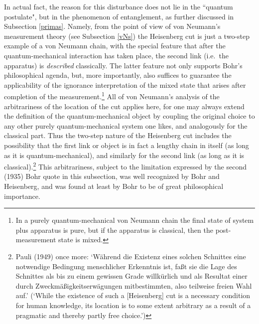 \documentclass[12pt,titlepage]{article}
\begin{document}
In actual fact, the reason for this disturbance does not lie in the    ``quantum postulate",  but in the phenomenon of entanglement, as further discussed in Subsection  \ref{primas}.
Namely, from the point of view of von Neumann's measurement theory (see Subsection \ref{vNs})
 the Heisenberg cut is just a two-step example of a von Neumann chain, with the special feature that after the quantum-mechanical interaction has taken place, the second link (i.e.\ the apparatus) is {\it described} classically.
The latter feature not only supports  Bohr's philosophical agenda, but, more importantly,
also suffices to guarantee the applicability of the ignorance interpretation of the mixed state that arises after completion of the measurement.\footnote{In a purely quantum-mechanical von Neumann chain the final state of system plus apparatus is pure, but if the
apparatus  is classical, then  the post-measurement state is mixed.} 
 All of von Neumann's analysis of the arbitrariness of the location of the cut applies here, for  one may always extend the definition of the quantum-mechanical object by coupling the original choice to any other purely quantum-mechanical system one likes, and analogously for the classical part. Thus the two-step nature of the Heisenberg cut includes the possibility that the first link or object is in fact a lengthy chain in itself (as long as it is quantum-mechanical), and similarly for the second link (as long as it is classical).\footnote{\label{PFN2} Pauli (1949) once more: `W\"{a}hrend die {\sc Existenz} eines solchen Schnittes eine notwendige Bedingung menschlicher Erkenntnis ist, fa\ss t sie die {\sc Lage} des Schnittes als bis zu einem gewissen Grade willk\"{u}rlich und als Resultat einer durch Zweckm\"{a}\ss igkeitserw\"{a}gungen mitbestimmten, also teilweise freien Wahl auf.'
(`While the {\sc existence} of such a [Heisenberg] cut is a necessary condition for human knowledge,
its {\sc location} is to some extent arbitrary as a result of a pragmatic and thereby partly 
free choice.')} This arbitrariness, subject to the limitation expressed by the second (1935) Bohr quote in this subsection, was well recognized by Bohr and Heisenberg, and was found at least by Bohr to be of great philosophical importance. 
\end{document}
